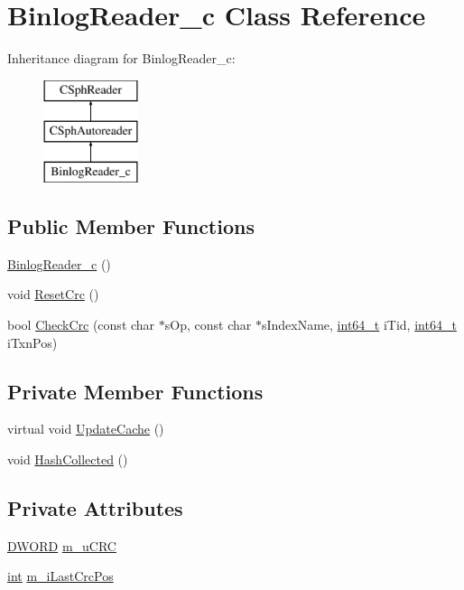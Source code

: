 \hypertarget{classBinlogReader__c}{\section{Binlog\-Reader\-\_\-c Class Reference}
\label{classBinlogReader__c}
}
Inheritance diagram for Binlog\-Reader\-\_\-c\-:\begin{figure}[H]
\begin{center}
\leavevmode
\includegraphics[height=3.000000cm]{classBinlogReader__c}
\end{center}
\end{figure}
\subsection*{Public Member Functions}
\begin{DoxyCompactItemize}
\item 
\hyperlink{classBinlogReader__c_aaffbc4889059a5f3d2725458cb424eef}{Binlog\-Reader\-\_\-c} ()
\item 
void \hyperlink{classBinlogReader__c_a95380dab34fe8b9d0bd7f9ca1b778cd8}{Reset\-Crc} ()
\item 
bool \hyperlink{classBinlogReader__c_a78ad9b6000521dc6fee44fa8e467f77d}{Check\-Crc} (const char $\ast$s\-Op, const char $\ast$s\-Index\-Name, \hyperlink{sphinxstd_8h_a996e72f71b11a5bb8b3b7b6936b1516d}{int64\-\_\-t} i\-Tid, \hyperlink{sphinxstd_8h_a996e72f71b11a5bb8b3b7b6936b1516d}{int64\-\_\-t} i\-Txn\-Pos)
\end{DoxyCompactItemize}
\subsection*{Private Member Functions}
\begin{DoxyCompactItemize}
\item 
virtual void \hyperlink{classBinlogReader__c_a249edada0086024219024833dbd34fc0}{Update\-Cache} ()
\item 
void \hyperlink{classBinlogReader__c_aba5f9ac4503bceb949e0b508b0c05623}{Hash\-Collected} ()
\end{DoxyCompactItemize}
\subsection*{Private Attributes}
\begin{DoxyCompactItemize}
\item 
\hyperlink{sphinxstd_8h_a798af1e30bc65f319c1a246cecf59e39}{D\-W\-O\-R\-D} \hyperlink{classBinlogReader__c_a538ce6083d17c7c86374ac21cebaf3e8}{m\-\_\-u\-C\-R\-C}
\item 
\hyperlink{sphinxexpr_8cpp_a4a26e8f9cb8b736e0c4cbf4d16de985e}{int} \hyperlink{classBinlogReader__c_ab3e18f5f5f9568cab6f04cf801b745f3}{m\-\_\-i\-Last\-Crc\-Pos}
\end{DoxyCompactItemize}
